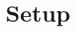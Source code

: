 \documentclass[../main.tex]{subfiles}
\begin{document}
\section{Setup}\label{sec:setup}
\end{document}
